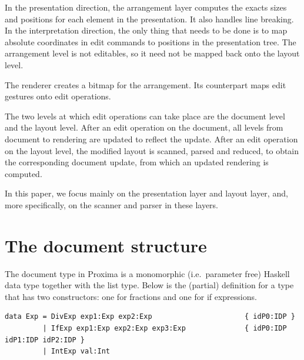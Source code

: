 \documentclass[12pt]{article}
\begin{document}
\noindent In the presentation direction, the arrangement layer computes the exacts sizes and positions for each element in the presentation. It also handles line breaking. In the interpretation direction, the only thing that needs to be done is to map absolute coordinates in edit commands to positions in the presentation tree. The arrangement level is not editables, so it need not be mapped back onto the layout level.

\noindent The renderer creates a bitmap for the arrangement. Its counterpart maps edit gestures onto edit operations.


The two levels at which edit operations can take place are the document level and the layout level. After an edit operation on the document, all levels from document to rendering are updated to reflect the update. After an edit operation on the layout level, the modified layout is scanned, parsed and reduced, to obtain the corresponding document update, from which an updated rendering is computed. 

In this paper, we focus mainly on the presentation layer and layout layer, and, more specifically, on the scanner and parser in these layers.




%
\section{The document structure}\label{sect:document}
%

The document type in Proxima is a monomorphic (i.e.\ parameter free) Haskell data type together with the list type. Below is the (partial) definition for a type  that has two constructors: one for fractions and one for if expressions. 


\begin{footnotesize}
\begin{verbatim}
data Exp = DivExp exp1:Exp exp2:Exp                      { idP0:IDP }
         | IfExp exp1:Exp exp2:Exp exp3:Exp              { idP0:IDP idP1:IDP idP2:IDP }
         | IntExp val:Int
\end{verbatim}
\end{footnotesize}
\end{document}
